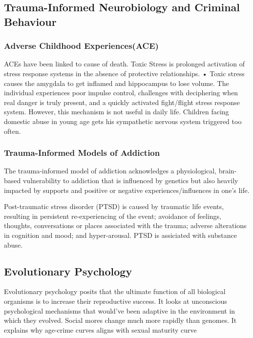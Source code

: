 \documentclass{article}
\begin{document}
\subsection{Trauma-Informed Neurobiology and Criminal Behaviour}
\subsubsection*{Adverse Childhood Experiences(ACE)}

ACEs have been linked to cause of death. Toxic Stress is prolonged activation of stress response systems in the absence of protective relationships. 	• Toxic stress causes the amygdala to get inflamed and hippocampus to lose volume. The individual experiences poor impulse control, challenges with deciphering when real danger is truly present, and a quickly activated fight/flight stress response system. However, this mechanism is not useful in daily life. Children facing domestic abuse in young age gets his sympathetic nervous system triggered too often.

\subsubsection*{Trauma-Informed Models of Addiction}

The trauma-informed model of addiction acknowledges a physiological, brain-based vulnerability to addiction that is influenced by genetics but also heavily impacted by supports and positive or negative experiences/influences in one’s life.

Post-traumatic stress disorder (PTSD) is caused by traumatic life events, resulting in persistent re-experiencing of the event; avoidance of feelings, thoughts, conversations or places associated with the trauma; adverse alterations in cognition and mood; and hyper-arousal. PTSD is assiciated with substance abuse.

\subsection{Evolutionary Psychology}

Evolutionary psychology posits that the ultimate function of all biological organisms is to increase their reproductive success. It looks at unconscious psychological mechanisms that would've been adaptive in the environment in which they evolved. Social mores change much more rapidly than genomes. It explains why age-crime curves aligns with sexual maturity curve
\end{document}
